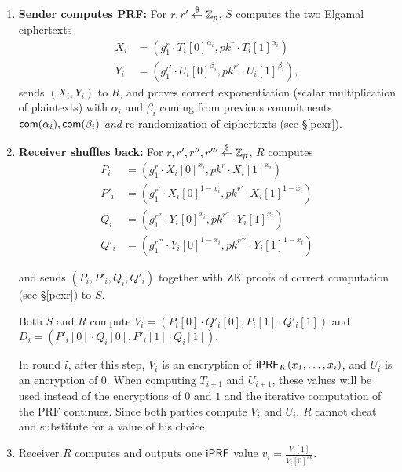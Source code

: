 \begin{enumerate}
\item {\bf Sender computes PRF:} For $r,r'\stackrel{\$}{\leftarrow}\mathbb{Z}_p$, $S$ computes the two Elgamal ciphertexts
  \begin{align*}
    X_i&=(g^r_1\cdot{}T_i[0]^{\alpha_i},pk^r\cdot{}T_i[1]^{\alpha_i})
    \\Y_i&=(g^{r'}_1\cdot{}U_i[0]^{\beta_i},pk^{r'}\cdot{}U_i[1]^{\beta_i}),
    \end{align*}
  sends $(X_i,Y_i)$ to $R$, and proves correct exponentiation
  (scalar multiplication of plaintexts) with $\alpha_i$ and $\beta_i$
  coming from previous commitments $\mathsf{com}{}(\alpha_i),\mathsf{com}{}(\beta_i)$
  \emph{and} re-randomization of ciphertexts (see \S\ref{pexr}).

\item {\bf Receiver shuffles back:}
  For $r,r',r'',r'''\stackrel{\$}{\leftarrow}\mathbb{Z}_p$, $R$ computes%
  \begin{align*}
    P_i&=(g_1^r\cdot{}X_i[0]^{x_i},pk^r\cdot{}X_i[1]^{x_i})
    \\P'_i&=(g_1^{r'}\cdot{}X_i[0]^{1-x_i},pk^{r'}\cdot{}X_i[1]^{1-x_i})
   \\Q_i&=(g_1^{r''}\cdot{}Y_i[0]^{x_i},pk^{r''}\cdot{}Y_i[1]^{x_i})
   \\Q'_i&=(g_1^{r'''}\cdot{}Y_i[0]^{1-x_i},pk^{r'''}\cdot{}Y_i[1]^{1-x_i})
\end{align*}
  and sends $(P_i,P'_i,Q_i,Q'_i)$ together with ZK proofs of correct
  computation (see \S\ref{pexr}) to $S$.

  Both $S$ and $R$ compute
  $V_i=(P_i[0]\cdot{}Q'_i[0],P_i[1]\cdot{}Q'_i[1])$ and
  $D_i=(P'_i[0]\cdot{}Q_i[0],P'_i[1]\cdot{}Q_i[1])$.
  
In round $i$, after this step, $V_i$ is an encryption of $\mathsf{i}\mathsf{PRF}_{K}(x_1,\ldots,x_i)$, and $U_i$ is an encryption of $0$.
When computing $T_{i+1}$ and $U_{i+1}$, these values will be used instead of the encryptions of $0$ and $1$ and the iterative computation of the PRF continues.
Since both parties compute $V_i$ and $U_i$, $R$ cannot cheat and substitute for a value of his choice.

\item Receiver $R$ computes and outputs one $\mathsf{i}\mathsf{PRF}$ value
  $v_i=\frac{V_i[1]}{V_{i}[0]^{sk}}$.
\end{enumerate}

